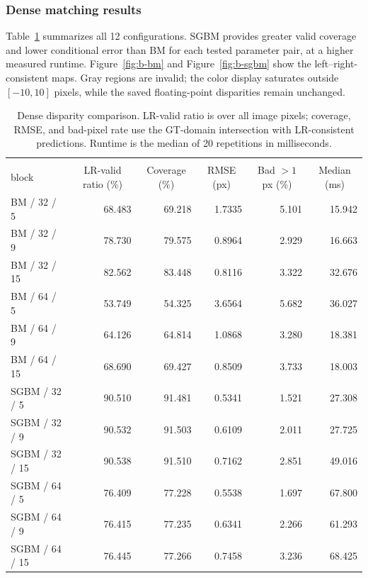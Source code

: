 \documentclass[a4paper,12pt]{article}
\begin{document}
\subsubsection{Dense matching results}
Table~\ref{tab:b-dense} summarizes all 12 configurations. SGBM provides greater valid coverage and lower conditional error than BM for each tested parameter pair, at a higher measured runtime. Figure~\ref{fig:b-bm} and Figure~\ref{fig:b-sgbm} show the left--right-consistent maps. Gray regions are invalid; the color display saturates outside $[-10,10]$ pixels, while the saved floating-point disparities remain unchanged.

\begin{table}[htbp]
\centering
\footnotesize
\setlength{\tabcolsep}{3pt}
\caption{Dense disparity comparison. LR-valid ratio is over all image pixels; coverage, RMSE, and bad-pixel rate use the GT-domain intersection with LR-consistent predictions. Runtime is the median of 20 repetitions in milliseconds.}
\label{tab:b-dense}
\begin{tabular}{lrrrrr}
\toprule
\shortstack{Method / $n_{\mathrm{disp}}$\\block} & \multicolumn{1}{c}{LR-valid ratio (\%)} & \multicolumn{1}{c}{Coverage (\%)} & \multicolumn{1}{c}{RMSE (px)} & \multicolumn{1}{c}{Bad $>1$ px (\%)} & \multicolumn{1}{c}{Median (ms)} \\
\midrule
BM / 32 / 5  & 68.483 & 69.218 & 1.7335 & 5.101 & 15.942 \\
BM / 32 / 9  & 78.730 & 79.575 & 0.8964 & 2.929 & 16.663 \\
BM / 32 / 15 & 82.562 & 83.448 & 0.8116 & 3.322 & 32.676 \\
BM / 64 / 5  & 53.749 & 54.325 & 3.6564 & 5.682 & 36.027 \\
BM / 64 / 9  & 64.126 & 64.814 & 1.0868 & 3.280 & 18.381 \\
BM / 64 / 15 & 68.690 & 69.427 & 0.8509 & 3.733 & 18.003 \\
SGBM / 32 / 5  & 90.510 & 91.481 & 0.5341 & 1.521 & 27.308 \\
SGBM / 32 / 9  & 90.532 & 91.503 & 0.6109 & 2.011 & 27.725 \\
SGBM / 32 / 15 & 90.538 & 91.510 & 0.7162 & 2.851 & 49.016 \\
SGBM / 64 / 5  & 76.409 & 77.228 & 0.5538 & 1.697 & 67.800 \\
SGBM / 64 / 9  & 76.415 & 77.235 & 0.6341 & 2.266 & 61.293 \\
SGBM / 64 / 15 & 76.445 & 77.266 & 0.7458 & 3.236 & 68.425 \\
\bottomrule
\end{tabular}
\end{table}
\end{document}
